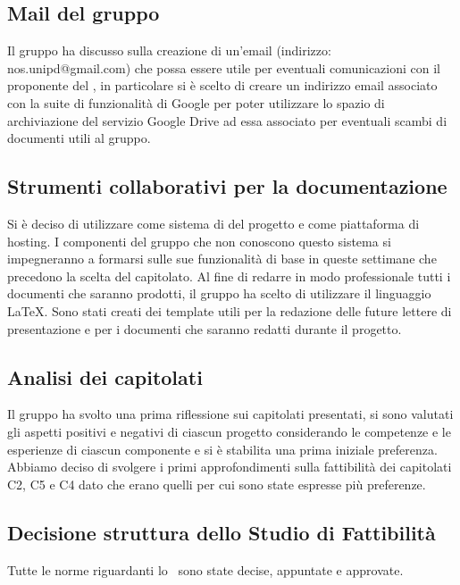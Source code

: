 \subsection{Mail del gruppo}
Il gruppo ha discusso sulla creazione di un'email (indirizzo: nos.unipd@gmail.com) che possa essere utile per eventuali comunicazioni con il proponente del , in particolare si è scelto di creare un indirizzo email associato con la suite di funzionalità di Google per poter utilizzare lo spazio di archiviazione del servizio Google Drive ad essa associato per eventuali scambi di documenti utili al gruppo.
\subsection{Strumenti collaborativi per la documentazione}
Si è deciso di utilizzare  come sistema di  del progetto e  come piattaforma di hosting. I componenti del gruppo che non conoscono questo sistema si impegneranno a formarsi sulle sue funzionalità di base in queste settimane che precedono la scelta del capitolato. Al fine di redarre in modo professionale tutti i documenti che saranno prodotti, il gruppo ha scelto di utilizzare il linguaggio \LaTeX. Sono stati creati dei template utili per la redazione delle future lettere di presentazione e per i documenti che saranno redatti durante il progetto.
\subsection{Analisi dei capitolati}
Il gruppo ha svolto una prima riflessione sui capitolati presentati, si sono valutati gli aspetti positivi e negativi di ciascun progetto considerando le competenze e le esperienze di ciascun componente e si è stabilita una prima iniziale preferenza.
Abbiamo deciso di svolgere i primi approfondimenti sulla fattibilità dei capitolati C2, C5 e C4 dato che erano quelli per cui sono state espresse più preferenze.
\subsection{Decisione struttura dello Studio di Fattibilità}
Tutte le norme riguardanti lo \SdF\ sono state decise, appuntate e approvate.
